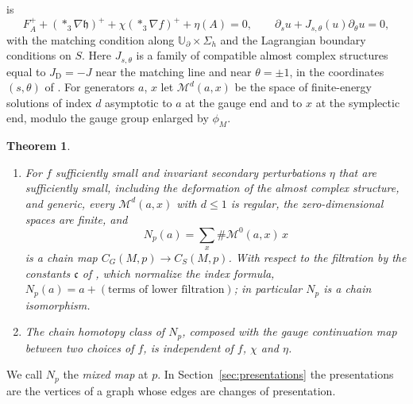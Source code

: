 \documentclass[11pt]{amsart}
\newtheorem{theorem}{Theorem}[section]
\theoremstyle{definition}
\theoremstyle{remark}
\theoremstyle{plain}
\numberwithin{equation}{section}
\newcommand{\cM}{\mathcal{M}}
\begin{document}
is
\begin{equation}\label{eq:mixed}
F_A^++(*_3\nabla\mathfrak h)^++\chi(*_3\nabla f)^++\eta(A)=0,\qquad
\partial_su+J_{s,\theta}(u)\partial_\theta u=0,
\end{equation}
with the matching condition along $\mathbb U_\partial\times\Sigma_h$ and the
Lagrangian boundary conditions on $S$. Here $J_{s,\theta}$ is a family of compatible almost
complex structures equal to $J_{\mathrm D}=-J$ near the matching line and near $\theta=\pm1$, in
the coordinates $(s,\theta)$ of \cite[Section~3.1]{DFL}. For generators $a$, $x$ let
$\cM^d(a,x)$ be the space of finite-energy solutions of index $d$
asymptotic to $a$ at the gauge end and to $x$ at the symplectic end,
modulo the gauge group enlarged by $\phi_M$.

\begin{theorem}\label{thm:mixed-iso}
\begin{enumerate}[label=(\roman*)]
\item For $f$ sufficiently small and invariant secondary perturbations $\eta$
  that are sufficiently small, including the deformation of the almost complex
  structure, and generic, every $\cM^d(a,x)$ with $d\le1$ is regular, the
  zero-dimensional spaces are finite, and
  \[
  N_p(a)=\sum_x\#\cM^0(a,x)\,x
  \]
  is a chain map $C_G(M,p)\to C_S(M,p)$. With respect to the filtration
  by the constants $\mathfrak c$ of \cite[Proposition~2.53]{DFL}, which
  normalize the index formula,
  $N_p(a)=a+(\text{terms of lower filtration})$; in particular $N_p$ is a
  chain isomorphism.
\item The chain homotopy class of $N_p$, composed with the gauge
  continuation map between two choices of $f$, is independent of $f$,
  $\chi$ and $\eta$.
\end{enumerate}
\end{theorem}

We call $N_p$ the \emph{mixed map} at $p$. In Section~\ref{sec:presentations} the
presentations are the vertices of a graph whose edges are changes of presentation.
\end{document}
